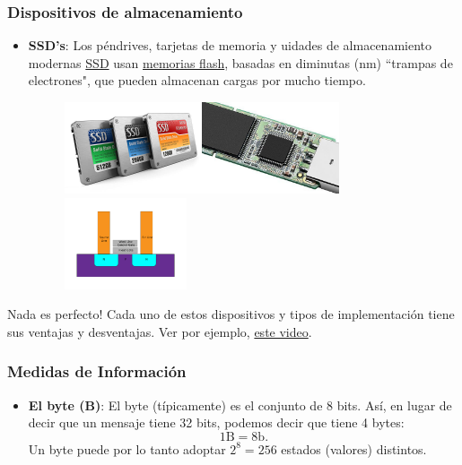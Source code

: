 \documentclass[aspectratio=169]{beamer}
\begin{document}
\begin{frame}[fragile]\frametitle{Dispositivos de almacenamiento}
\begin{itemize}
	\item \textbf{SSD's}: Los péndrives, tarjetas de memoria y uidades de almacenamiento modernas \href{https://es.wikipedia.org/wiki/Unidad_de_estado_s\%C3\%B3lido}{SSD} usan  \href{https://es.wikipedia.org/wiki/Memoria_flash}{memorias flash}, basadas en diminutas (nm) ``trampas de electrones", que pueden almacenan cargas por mucho tiempo.
	\begin{figure}
		\begin{center}
		\includegraphics[height=2.7cm]{figs/ssds.jpg}\hspace{0.5cm}\includegraphics[height=2.7cm]{figs/nand_flash_memory_mobile.jpg}\hspace{0.5cm}\includegraphics[height=2.7cm]{figs/Flash_cell_structure.svg.png}
		\end{center}
			\end{figure}
\end{itemize}
\begin{alertblock}{Nada es perfecto!}
Cada uno de estos dispositivos y tipos de implementación tiene sus ventajas y desventajas. Ver por ejemplo, \href{https://youtu.be/Sq3OjI3tVIM?si=Le57aclYU3NDnUOE}{este video}.
\end{alertblock}
\end{frame}

\begin{frame}[fragile]\frametitle{Medidas de Información}
\begin{itemize}
\item \textbf{El byte (B)}: El byte (típicamente) es el conjunto de 8 bits. Así, en lugar de decir que un mensaje tiene 32 bits, podemos decir que tiene 4 bytes:
$$
1 \text{B} = 8 \text{b}.
$$
Un byte puede por lo tanto adoptar $2^8=256$ estados (valores) distintos. 
\end{itemize}
\end{frame}
\end{document}
